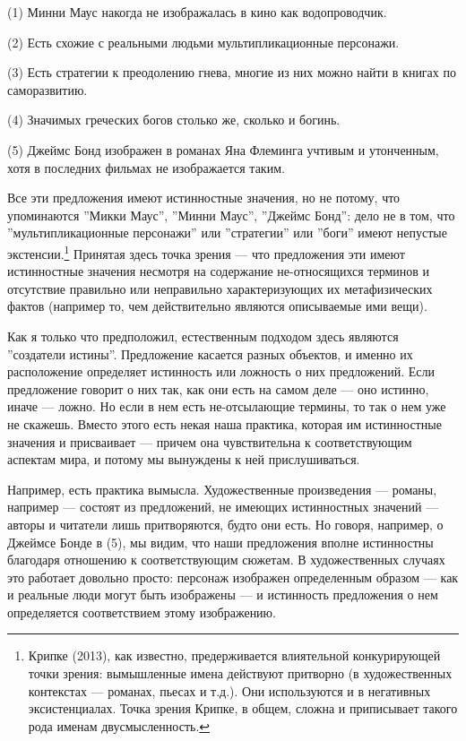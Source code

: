\documentclass[11pt]{book}
\begin{document}
\smallskip

(1) Минни Маус накогда не изображалась в кино как водопроводчик.

(2) Есть схожие с реальными людьми мультипликационные персонажи.

(3) Есть стратегии к преодолению гнева, многие из них можно найти в книгах по саморазвитию.

(4) Значимых греческих богов столько же, сколько и богинь.

(5) Джеймс Бонд изображен в романах Яна Флеминга учтивым и утонченным, хотя в последних фильмах не изображается таким.

\smallskip

Все эти предложения имеют истинностные значения, но не потому, что упоминаются ''Микки Маус'', ''Минни Маус'', ''Джеймс Бонд'': дело не в том, что ''мультипликационные персонажи'' или ''стратегии'' или ''боги'' имеют непустые экстенсии.\footnote{Крипке (2013), как известно, предерживается влиятельной конкурирующей точки зрения: вымышленные имена действуют притворно (в художественных контекстах --- романах, пьесах и т.д.). Они используются и в негативных эксистенциалах. Точка зрения Крипке, в общем, сложна и приписывает такого рода именам двусмысленность.} Принятая здесь точка зрения --- что предложения эти имеют истинностные значения несмотря на содержание не-относящихся терминов и отсутствие правильно или неправильно характеризующих их метафизических фактов (например то, чем действительно являются описываемые ими вещи).

Как я только что предположил, естественным подходом здесь являются ''создатели истины''. Предложение касается разных объектов, и именно их расположение определяет истинность или ложность о них предложений. Если предложение говорит о них так, как они есть на самом деле --- оно истинно, иначе --- ложно. Но если в нем есть не-отсылающие термины, то так о нем уже не скажешь. Вместо этого есть некая наша практика, которая им истинностные значения и присваивает --- причем она чувствительна к соответствующим аспектам мира, и потому мы вынуждены к ней прислушиваться.

Например, есть практика вымысла. Художественные произведения --- романы, например --- состоят из предложений, не имеющих истинностных значений --- авторы и читатели лишь притворяются, будто они есть. Но говоря, например, о Джеймсе Бонде в (5), мы видим, что наши предложения вполне истинностны благодаря отношению к соответствующим сюжетам. В художественных случаях это работает довольно просто: персонаж изображен определенным образом --- как и реальные люди могут быть изображены --- и истинность предложения о нем определяется соответствием этому изображению.
\end{document}
